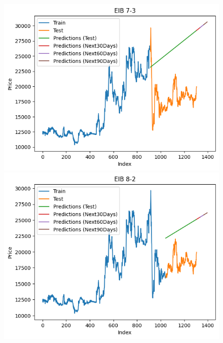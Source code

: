 \begin{figure}[H]
\begin{minipage}{0.15\textwidth}
    \includegraphics[width=1\textwidth]{resources/chapter-5/newdata1/result/EIB_LinearRegression_7-3.png}
    \end{minipage}
    \hfill
    \begin{minipage}{0.15\textwidth}
    \centering
    \includegraphics[width=1\textwidth]{resources/chapter-5/newdata1/result/EIB_LinearRegression_8-2.png}
    \end{minipage}
    \hfill
        \begin{minipage}{0.15\textwidth}
    \centering

\end{minipage}
\end{figure}

